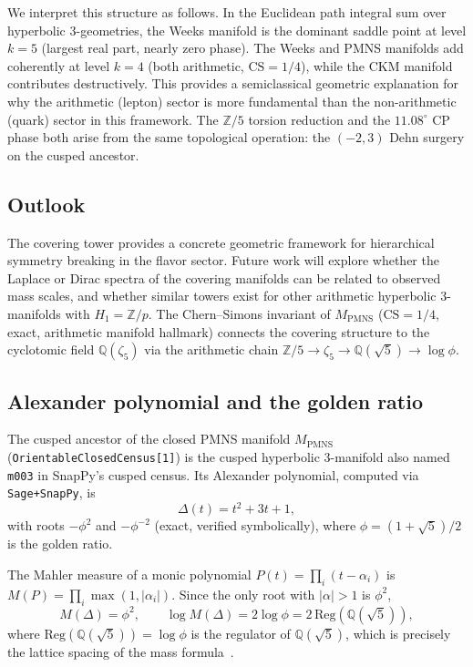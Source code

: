 ﻿\documentclass[12pt]{article}
\theoremstyle{definition}
\begin{document}
We interpret this structure as follows.
In the Euclidean path integral sum over hyperbolic 3-geometries,
the Weeks manifold is the dominant saddle point at level $k=5$
(largest real part, nearly zero phase).
The Weeks and PMNS manifolds add coherently at level $k=4$
(both arithmetic, $\mathrm{CS}=1/4$), while the CKM manifold
contributes destructively.
This provides a semiclassical geometric explanation for why the
arithmetic (lepton) sector is more fundamental than the
non-arithmetic (quark) sector in this framework.
The $\mathbb{Z}/5$ torsion reduction and the $11.08^\circ$ CP phase
both arise from the same topological operation: the $(-2,3)$
Dehn surgery on the cusped ancestor.


\subsection{Outlook}

The covering tower provides a concrete geometric framework for
hierarchical symmetry breaking in the flavor sector. Future work
will explore whether the Laplace or Dirac spectra of the covering
manifolds can be related to observed mass scales, and whether
similar towers exist for other arithmetic hyperbolic 3-manifolds
with $H_1=\mathbb{Z}/p$. The Chern--Simons invariant of $M_\text{PMNS}$
($\mathrm{CS}=1/4$, exact, arithmetic manifold hallmark) connects
the covering structure to the cyclotomic field
$\mathbb{Q}(\zeta_5)$ via the arithmetic chain
$\mathbb{Z}/5\to\zeta_5\to\mathbb{Q}(\sqrt{5})\to\log\phi$.


\subsection{Alexander polynomial and the golden ratio}
\label{subsec:alexander}

The cusped ancestor of the closed PMNS manifold $M_\text{PMNS}$
(\texttt{OrientableClosedCensus[1]}) is the cusped hyperbolic 3-manifold
also named \texttt{m003} in SnapPy's cusped census.  Its Alexander
polynomial, computed via \texttt{Sage+SnapPy}, is
\[
\Delta(t) = t^2 + 3t + 1,
\]
with roots $-\phi^2$ and $-\phi^{-2}$ (exact, verified symbolically),
where $\phi = (1+\sqrt5)/2$ is the golden ratio.

The Mahler measure of a monic polynomial $P(t)=\prod_i(t-\alpha_i)$ is
$M(P)=\prod_i\max(1,|\alpha_i|)$.  Since the only root with $|\alpha|>1$
is $\phi^2$,
\[
M(\Delta) = \phi^2, \qquad
\log M(\Delta) = 2\log\phi = 2\,\mathrm{Reg}(\mathbb{Q}(\sqrt{5})),
\]
where $\mathrm{Reg}(\mathbb{Q}(\sqrt{5}))=\log\phi$ is the regulator of
$\mathbb{Q}(\sqrt{5})$, which is precisely the lattice spacing of the
mass formula~\cite{Gentry:ShapeSpace}.
\end{document}
